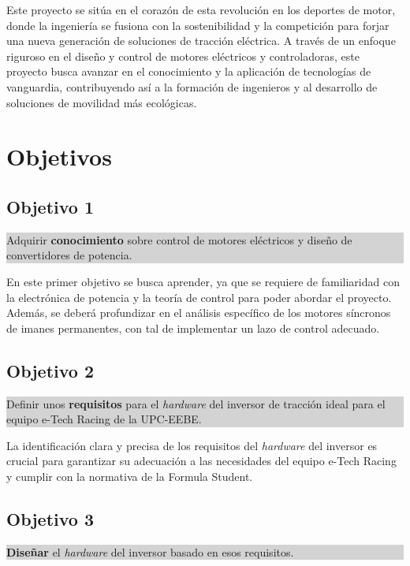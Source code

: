 Este proyecto se sitúa en el corazón de esta revolución en los deportes de motor, donde la ingeniería se fusiona con la sostenibilidad y la competición para forjar una nueva generación de soluciones de tracción eléctrica. A través de un enfoque riguroso en el diseño y control de motores eléctricos y controladoras, este proyecto busca avanzar en el conocimiento y la aplicación de tecnologías de vanguardia, contribuyendo así a la formación de ingenieros y al desarrollo de soluciones de movilidad más ecológicas.

\section{Objetivos}

\subsection*{Objetivo 1}
\setlength{\fboxsep}{10pt}
\setlength{\fboxrule}{1pt}
\setlength{\parindent}{0pt}
\setlength{\parskip}{10pt}
\setlength{\leftskip}{\dimexpr\fboxsep+\fboxrule}
\setlength{\rightskip}{\dimexpr\fboxsep+\fboxrule}
\colorbox{lightgray}{%
	\parbox{\dimexpr\linewidth-2\fboxsep-2\fboxrule}{%
		Adquirir \textbf{conocimiento} sobre control de motores eléctricos y diseño de convertidores de potencia.%
	}%
}

En este primer objetivo se busca aprender, ya que se requiere de familiaridad con la electrónica de potencia y la teoría de control para poder abordar el proyecto. Además, se deberá profundizar en el análisis específico de los motores síncronos de imanes permanentes, con tal de implementar un lazo de control adecuado.


\subsection*{Objetivo 2}
\colorbox{lightgray}{%
	\parbox{\dimexpr\linewidth-2\fboxsep-2\fboxrule}{%
		Definir unos \textbf{requisitos} para el \textit{hardware} del inversor de tracción ideal para el equipo e-Tech Racing de la UPC-EEBE.%
	}%
}

La identificación clara y precisa de los requisitos del \textit{hardware} del inversor es crucial para garantizar su adecuación a las necesidades del equipo e-Tech Racing y cumplir con la normativa de la Formula Student.

\subsection*{Objetivo 3}
\colorbox{lightgray}{%
	\parbox{\dimexpr\linewidth-2\fboxsep-2\fboxrule}{%
		\textbf{Diseñar} el \textit{hardware} del inversor basado en esos requisitos.%
	}%
}

